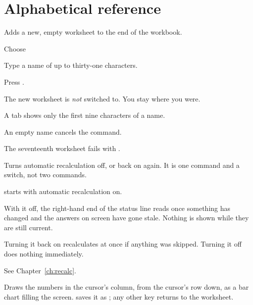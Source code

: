 \section{Alphabetical reference}


Adds a new, empty worksheet to the end of the workbook.

\begin{ccprocedure}[]
\item Choose 
\item Type a name of up to thirty-one characters.
\item Press .
\end{ccprocedure}

\begin{ccsteps}
\item The new worksheet is \emph{not} switched to. You stay where you were.
\item A tab shows only the first nine characters of a name.
\item An empty name cancels the command.
\item The seventeenth worksheet fails with .
\end{ccsteps}


Turns automatic recalculation off, or back on again. It is one command and a
switch, not two commands.

\begin{ccsteps}
\item \ccprod{} starts with automatic recalculation on.
\item With it off, the right-hand end of the status line reads  once
something has changed and the answers on screen have gone stale. Nothing is
shown while they are still current.
\item Turning it back on recalculates at once if anything was skipped. Turning
it off does nothing immediately.
\item See Chapter~\ref{ch:recalc}.
\end{ccsteps}


Draws the numbers in the cursor's column, from the cursor's row down, as a bar
chart filling the screen.  saves it as ; any other key
returns to the worksheet.

